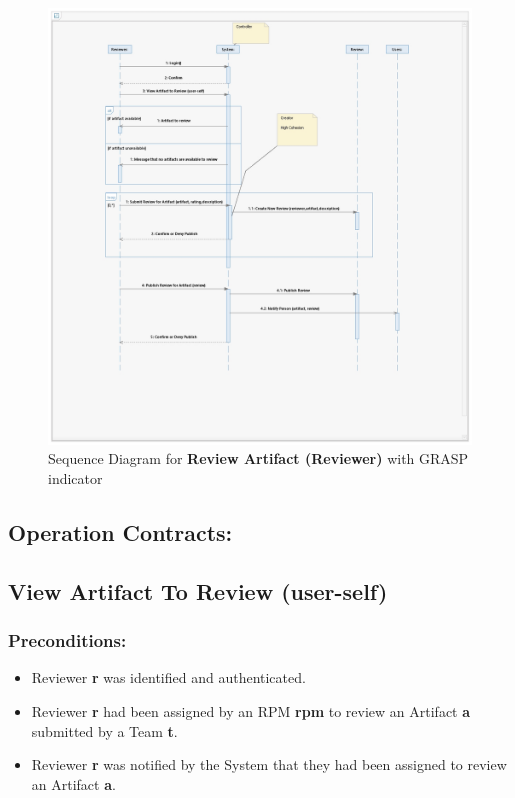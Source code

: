 \begin{figure}[h]
\includegraphics[width=13cm]{SD_ReviewArtifact_5.jpeg}
\centering
\caption{Sequence Diagram for \textbf{Review Artifact (Reviewer)} with GRASP indicator}
\end{figure}




\subsection*{Operation Contracts:}
\subsection*{View Artifact To Review (user-self)}
\subsubsection*{Preconditions:}
\begin{itemize}
\itemsep-1em 
    \item Reviewer \textbf{r} was identified and authenticated. 
    \item Reviewer \textbf{r} had been assigned by an RPM \textbf{rpm} to review an Artifact \textbf{a} submitted by a Team \textbf{t}.
    \item Reviewer \textbf{r} was notified by the System that they had been assigned to review an Artifact \textbf{a}.
\end{itemize}



